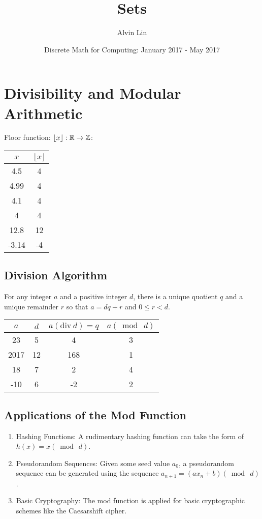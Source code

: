 \documentclass[letterpaper, 12pt]{math}
\title{Sets}
\author{Alvin Lin}
\date{Discrete Math for Computing: January 2017 - May 2017}
\begin{document}
\maketitle

\section*{Divisibility and Modular Arithmetic}
Floor function: \( \lfloor x\rfloor:\mathbb{R}\to\mathbb{Z} \):
\begin{center}
  \begin{tabular}{|c|c|}
    \hline
    \( x \) & \( \lfloor x\rfloor \) \\
    \hline
    4.5 & 4 \\
    \hline
    4.99 & 4 \\
    \hline
    4.1 & 4 \\
    \hline
    4 & 4 \\
    \hline
    12.8 & 12 \\
    \hline
    -3.14 & -4 \\
    \hline
  \end{tabular}
\end{center}

\subsection*{Division Algorithm}
For any integer \( a \) and a positive integer \( d \), there is a unique
quotient \( q \) and a unique remainder \( r \) so that \( a = dq+r \) and
\( 0\leq r<d \).
\begin{center}
  \begin{tabular}{|c|c|c|c|}
    \hline
    \( a \) & \( d \) & \( a(\mathrm{div}\ d) = q \) & \( a(\bmod\ d) \) \\
    \hline
    23 & 5 & 4 & 3 \\
    \hline
    2017 & 12 & 168 & 1 \\
    \hline
    18 & 7 & 2 & 4 \\
    \hline
    -10 & 6 & -2 & 2 \\
    \hline
  \end{tabular}
\end{center}

\subsection*{Applications of the Mod Function}
\begin{enumerate}
  \item Hashing Functions: A rudimentary hashing function can take the form of
    \( h(x) = x(\bmod\ d) \).
  \item Pseudorandom Sequences: Given some seed value \( a_{0} \), a
    pseudorandom sequence can be generated using the sequence
    \( a_{n+1} = (ax_{n}+b) (\bmod\ d) \).
  \item Basic Cryptography: The mod function is applied for basic cryptographic
    schemes like the Caesarshift cipher.
\end{enumerate}
\end{document}
